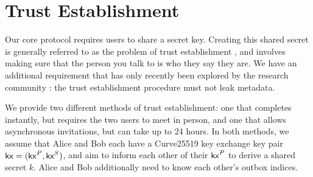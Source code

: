 \section{Trust Establishment}
\label{sec:trustestablishment}

Our core protocol requires users to share a secret key. Creating this shared secret is generally referred to as the problem of trust establishment \cite{unger2015sok}, and involves making sure that the person you talk to is who they say they are. We have an additional requirement that has only recently been explored by the research community \cite{liutromer2021}: the trust establishment procedure must not leak metadata.



We provide two different methods of trust establishment: one that completes instantly, but requires the two users to meet in person, and one that allows asynchronous invitations, but can take up to 24 hours. In both methods, we assume that Alice and Bob each have a Curve25519 key exchange key pair $\mathsf{kx} = (\mathsf{kx}^P, \mathsf{kx}^S)$, and aim to inform each other of their $\mathsf{kx}^P$ to derive a shared secret $k$. Alice and Bob additionally need to know each other's outbox indices.







